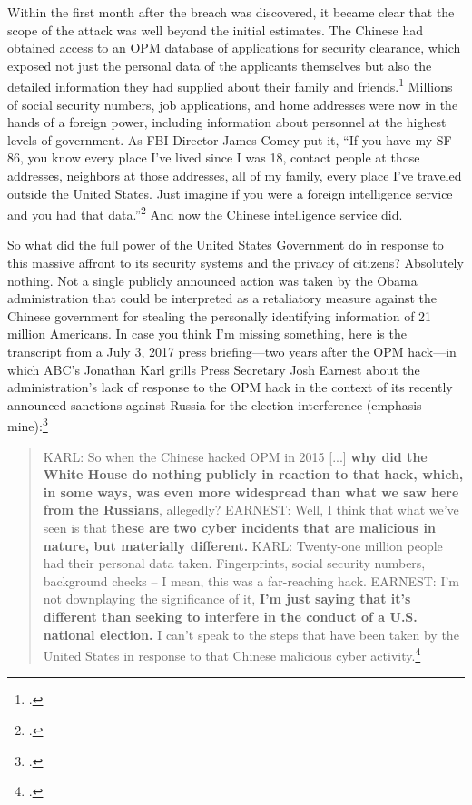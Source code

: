\documentclass{report}
\begin{document}
\begin{refsegment}
Within the first month after the breach was discovered, it became clear that the scope of the attack was well beyond the initial estimates. The Chinese had obtained access to an OPM database of applications for security clearance, which exposed not just the personal data of the applicants themselves but also the detailed information they had supplied about their family and friends.\footcite{nakashima_hacks_2015} Millions of social security numbers, job applications, and home addresses were now in the hands of a foreign power, including information about personnel at the highest levels of government. As FBI Director James Comey put it, ``If you have my SF 86, you know every place I've lived since I was 18, contact people at those addresses, neighbors at those addresses, all of my family, every place I've traveled outside the United States. Just imagine if you were a foreign intelligence service and you had that data.''\footcite{nakashima_hacks_2015} And now the Chinese intelligence service did.

So what did the full power of the United States Government do in response to this massive affront to its security systems and the privacy of citizens? Absolutely nothing. Not a single publicly announced action was taken by the Obama administration that could be interpreted as a retaliatory measure against the Chinese government for stealing the personally identifying information of 21 million Americans.  In case you think I'm missing something, here is the transcript from a July 3, 2017 press briefing---two years after the OPM hack---in which ABC's Jonathan Karl grills Press Secretary Josh Earnest about the administration's lack of response to the OPM hack in the context of its recently announced sanctions against Russia for the election interference (emphasis mine):\footcite[You can watch the full exchange via video here. It's pretty awkward.]{gill_earnest_2017}

\begin{quote}
KARL: So when the Chinese hacked OPM in 2015 [...] \textbf{why did the White House do nothing publicly in reaction to that hack, which, in some ways, was even more widespread than what we saw here from the Russians}, allegedly?
\newline \newline
EARNEST: Well, I think that what we've seen is that \textbf{these are two cyber incidents that are malicious in nature, but materially different.}
\newline \newline
KARL: Twenty-one million people had their personal data taken.  Fingerprints, social security numbers, background checks -- I mean, this was a far-reaching hack.
\newline \newline
EARNEST: I'm not downplaying the significance of it, \textbf{I'm just saying that it's different than seeking to interfere in the conduct of a U.S. national election.} I can't speak to the steps that have been taken by the United States in response to that Chinese malicious cyber activity.\footcite[Transcript adapted from the official White House website.]{earnest_press_2017}
\end{quote}


\end{refsegment}
\end{document}
